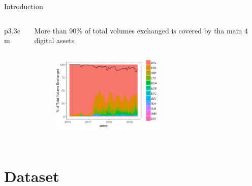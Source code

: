 \documentclass[c, 10pt]{beamer}
\begin{document}
\begin{frame}{Introduction}
\begin{columns}[T]
\begin{column}{.35\linewidth}
\begin{tabular}{p{3.3cm}}
		\end{tabular}
		\end{column}
		\vrule{}
		\hspace{10pt}
		\begin{column}{.50\linewidth}
		\begin{minipage}[c][.6\textheight][c]{\linewidth}
		More than 90\% of total volumes exchanged is covered by tha main 4 digital assets
		\begin{figure}
			\centering
			\includegraphics[height=4.4cm, width=5.5cm]{Images/volumi}
		\end{figure}
		\end{minipage}
		\end{column}	
	\end{columns}
\end{frame}



\section{Dataset}
\end{document}

